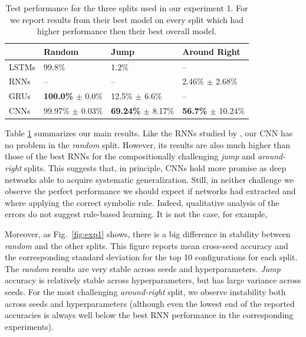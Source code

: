 \begin{table}[t!]
    \footnotesize
    \centering
        \begin{tabular}{l |l| l | l}
            \hline & \textbf{Random} & \textbf{Jump} & \textbf{Around Right} \\ \hline
             LSTMs \cite{Lake:Baroni:2017} & 99.8\% & 1.2\% & -- \\
             RNNs \cite{Loula:etal:2018} & -- & -- &  2.46\% $\pm$ 2.68\% \\
             GRUs \cite{Bastings:etal:2018} & \textbf{100.0\%} $\pm$ 0.0\% & 12.5\% $\pm$ 6.6\% & --  \\
             \hline
             CNNs & 99.97\% $\pm$ 0.03\% & \textbf{69.24\%} $\pm$ 8.17\%  & \textbf{56.7\%} $\pm$ 10.24\% \\
        \end{tabular}
    \caption{\footnotesize \label{table:main results}  Test performance for the three splits used in our experiment 1. For  
    we report results from their best model on every split
    which had higher performance then their best overall model.}
\end{table}



Table \ref{table:main results} summarizes our main results. Like the RNNs studied by
, our CNN has no problem in the
\emph{random} split. However, its results are also much higher than
those of the best RNNs for the compositionally challenging \emph{jump}
and \emph{around-right} splits. This suggests that, in principle, CNNs
hold more promise as deep networks able to acquire systematic
generalization. Still, in neither challenge we observe the perfect
performance we should expect if networks had extracted and where
applying the correct symbolic rule. Indeed, qualitative analysis of
the errors do not suggest rule-based learning. It is not the case, for
example, 

Moreover, as Fig.~\ref{fig:exp1} shows, there is a big difference in
stability between \emph{random} and the other splits. This figure
reports mean cross-seed accuracy and the corresponding standard
deviation for the top 10 configurations for each split. The
\emph{random} results are very stable across seeds and
hyperparameters. \emph{Jump} accuracy is relatively stable across
hyperparameters, but has large variance across seeds. For the most
challenging \emph{around-right} split, we observe instability both
across seeds and hyperparameters (although even the lowest end of the
reported accuracies is always well below the best RNN performance in
the corresponding experiments).

